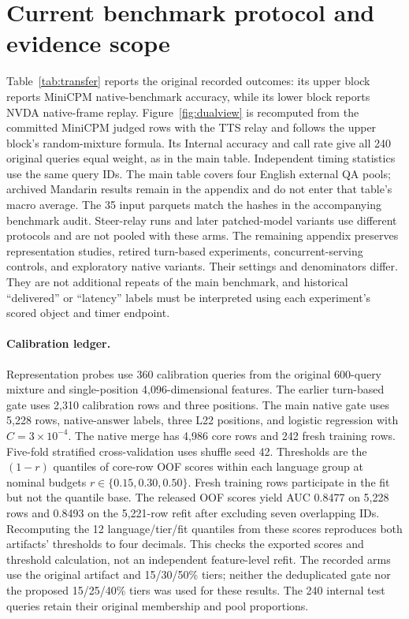 
\section{Current benchmark protocol and evidence scope}
\label{app:current-protocol}
Table~\ref{tab:transfer} reports the original recorded outcomes:
its upper block reports MiniCPM native-benchmark accuracy, while its
lower block reports NVDA native-frame replay. Figure~\ref{fig:dualview}
is recomputed from the committed MiniCPM judged rows with the TTS relay
and follows the upper block's random-mixture formula. Its Internal
accuracy and call rate give all 240 original queries equal weight,
as in the main table. Independent timing statistics use the same query IDs.
The main table covers four English
external QA pools; archived Mandarin results remain in the appendix
and do not enter that table's macro average. The 35 input
parquets match the hashes in the accompanying benchmark audit.
Steer-relay runs and later patched-model variants use different
protocols and are not pooled with these arms. The
remaining appendix preserves representation studies, retired
turn-based experiments, concurrent-serving controls, and exploratory
native variants. Their settings and denominators differ. They are
not additional repeats of the main benchmark, and historical
``delivered'' or ``latency'' labels must be interpreted using each
experiment's scored object and timer endpoint.



\paragraph{Calibration ledger.}
Representation probes use 360 calibration queries from the original
600-query mixture and single-position 4,096-dimensional features.
The earlier turn-based gate uses 2,310 calibration rows and three
positions. The main native gate uses 5,228 rows, native-answer labels,
three L22 positions, and logistic regression with $C=3\times10^{-4}$.
The native merge has 4,986 core rows and 242 fresh training rows.
Five-fold stratified cross-validation uses shuffle seed 42. Thresholds
are the $(1-r)$ quantiles of core-row OOF scores within each language
group at nominal budgets $r\in\{0.15,0.30,0.50\}$. Fresh training rows
participate in the fit but not the quantile base. The released OOF
scores yield AUC 0.8477 on 5,228 rows and 0.8493 on the 5,221-row
refit after excluding seven overlapping IDs. Recomputing the 12
language/tier/fit quantiles from these scores reproduces both
artifacts' thresholds to four decimals. This checks the exported
scores and threshold calculation, not an independent feature-level
refit. The recorded arms use the original artifact and 15/30/50\%
tiers; neither the deduplicated gate nor the proposed 15/25/40\%
tiers was used for these results. The 240 internal test queries
retain their original membership and pool proportions.

